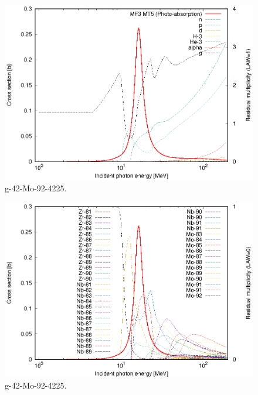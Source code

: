 \begin{figure}
 \includegraphics[width=\linewidth]{eps/g_42-Mo-92_4225.eps}
  \caption{g-42-Mo-92-4225.}
\end{figure}
\begin{figure}
 \includegraphics[width=\linewidth]{eps-law0/g_42-Mo-92_4225.eps}
 \caption{g-42-Mo-92-4225.}
\end{figure}
\newpage \clearpage

